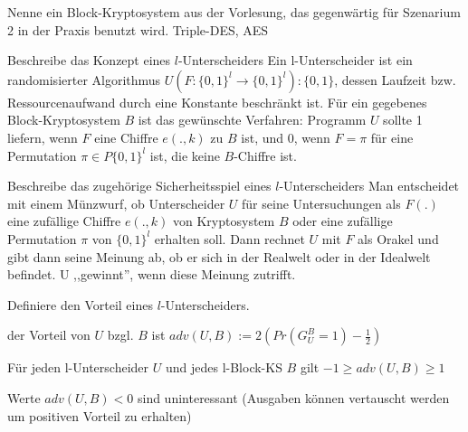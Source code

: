 \documentclass[avery5371, frame]{flashcards}
\begin{document}
\begin{flashcard}{Nenne ein Block-Kryptosystem aus der Vorlesung, das gegenwärtig für Szenarium 2 in der Praxis benutzt wird.}
    Triple-DES, AES
\end{flashcard}

\begin{flashcard}{Beschreibe das Konzept eines $l$-Unterscheiders}
    Ein l-Unterscheider ist ein randomisierter Algorithmus $U(F:\{0,1\}^l\rightarrow\{0,1\}^l):\{0,1\}$, dessen Laufzeit bzw. Ressourcenaufwand durch eine Konstante beschränkt ist.
    Für ein gegebenes Block-Kryptosystem $B$ ist das gewünschte Verfahren: Programm $U$ sollte 1 liefern, wenn $F$ eine Chiffre $e(.,k)$ zu $B$ ist, und $0$, wenn $F=\pi$ für eine Permutation $\pi\in P\{0,1\}^l$ ist, die keine $B$-Chiffre ist.
\end{flashcard}

\begin{flashcard}{Beschreibe das zugehörige Sicherheitsspiel eines $l$-Unterscheiders}
    Man entscheidet mit einem Münzwurf, ob Unterscheider $U$ für seine Untersuchungen als $F(.)$ eine zufällige Chiffre $e(.,k)$ von Kryptosystem $B$ oder eine zufällige Permutation $\pi$ von $\{0,1\}^l$ erhalten soll. Dann rechnet $U$ mit $F$ als Orakel und gibt dann seine Meinung ab, ob er sich in der Realwelt oder in der Idealwelt befindet. U ,,gewinnt'', wenn diese Meinung zutrifft.
\end{flashcard}

\begin{flashcard}{Definiere den Vorteil eines $l$-Unterscheiders.}
    \begin{itemize*}
        \item der Vorteil von $U$ bzgl. $B$ ist $adv(U,B):= 2(Pr(G^B_U=1)-\frac{1}{2})$
        \item Für jeden l-Unterscheider $U$ und jedes l-Block-KS $B$ gilt $-1\geq adv(U,B)\geq 1$
        \item Werte $adv(U,B)<0$ sind uninteressant (Ausgaben können vertauscht werden um positiven Vorteil zu erhalten)
    \end{itemize*}
\end{flashcard}
\end{document}
